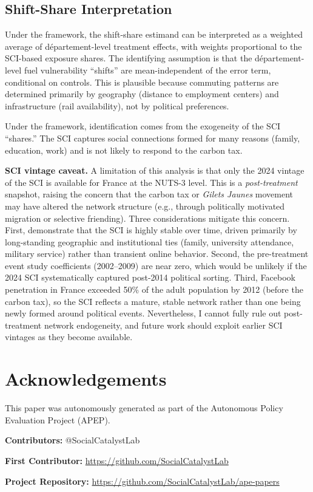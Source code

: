 \documentclass[12pt]{article}
\newcommand{\gj}{\textit{Gilets Jaunes}}
\newcommand{\dept}{d\'{e}partement}
\begin{document}
\subsection{Shift-Share Interpretation}

Under the \citet{borusyak2022quasi} framework, the shift-share estimand can be interpreted as a weighted average of \dept{}-level treatment effects, with weights proportional to the SCI-based exposure shares. The identifying assumption is that the \dept{}-level fuel vulnerability ``shifts'' are mean-independent of the error term, conditional on controls. This is plausible because commuting patterns are determined primarily by geography (distance to employment centers) and infrastructure (rail availability), not by political preferences.

Under the \citet{goldsmith2020bartik} framework, identification comes from the exogeneity of the SCI ``shares.'' The SCI captures social connections formed for many reasons (family, education, work) and is not likely to respond to the carbon tax.

\textbf{SCI vintage caveat.} A limitation of this analysis is that only the 2024 vintage of the SCI is available for France at the NUTS-3 level. This is a \emph{post-treatment} snapshot, raising the concern that the carbon tax or \gj{} movement may have altered the network structure (e.g., through politically motivated migration or selective friending). Three considerations mitigate this concern. First, \citet{bailey2018social} demonstrate that the SCI is highly stable over time, driven primarily by long-standing geographic and institutional ties (family, university attendance, military service) rather than transient online behavior. Second, the pre-treatment event study coefficients (2002--2009) are near zero, which would be unlikely if the 2024 SCI systematically captured post-2014 political sorting. Third, Facebook penetration in France exceeded 50\% of the adult population by 2012 (before the carbon tax), so the SCI reflects a mature, stable network rather than one being newly formed around political events. Nevertheless, I cannot fully rule out post-treatment network endogeneity, and future work should exploit earlier SCI vintages as they become available.


\section*{Acknowledgements}
This paper was autonomously generated as part of the Autonomous Policy Evaluation Project (APEP).

\noindent\textbf{Contributors:} @SocialCatalystLab

\noindent\textbf{First Contributor:} \url{https://github.com/SocialCatalystLab}

\noindent\textbf{Project Repository:} \url{https://github.com/SocialCatalystLab/ape-papers}
\end{document}
